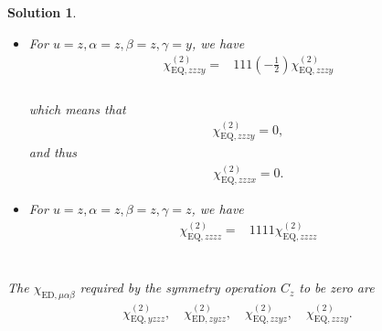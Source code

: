 \documentclass[UTF8,10pt,a4paper]{article}
\theoremstyle{Problem}
\theoremstyle{Solution}
\newtheorem*{sol}{Solution}
\begin{document}
\begin{sol}
\begin{itemize}
\footnotesize\begin{align}
\nonumber\chi_{\text{EQ},zzzx}^{(2)}=&111\left(-\frac{\sqrt{3}}{2}\right)\chi_{\text{EQ},zzzy}^{(2)}\\
\nonumber&\\
\nonumber&\\
\nonumber&\\
&
\end{align}\normalsize
\item For $u=z,\alpha=z,\beta=z,\gamma=y$, we have
\footnotesize\begin{align}
\nonumber\chi_{\text{EQ},zzzy}^{(2)}=&111\left(-\frac{1}{2}\right)\chi_{\text{EQ},zzzy}^{(2)}\\
\nonumber&\\
\nonumber&\\
\nonumber&\\
&
\end{align}\normalsize
which means that
\begin{align}
    \chi_{\text{EQ},zzzy}^{(2)}=0,
\end{align}
and thus
\begin{align}
    \chi_{\text{EQ},zzzx}^{(2)}=0.
\end{align}
\item For $u=z,\alpha=z,\beta=z,\gamma=z$, we have
\footnotesize\begin{align}
\nonumber\chi_{\text{EQ},zzzz}^{(2)}=&1111\chi_{\text{EQ},zzzz}^{(2)}\\
\nonumber&\\
\nonumber&\\
\nonumber&\\
&
\end{align}\normalsize
\end{itemize}

    The $\chi_{\text{ED},\mu\alpha\beta}$ required by the symmetry operation $C_z$ to be zero are
    \begin{gather*}
        \chi_{\text{EQ},yzzz}^{(2)},\quad\chi_{\text{ED},zyzz}^{(2)},\quad\chi_{\text{EQ},zzyz}^{(2)},\quad\chi_{\text{EQ},zzzy}^{(2)}.
    \end{gather*}



\end{sol}
\end{document}
